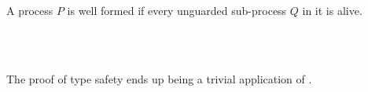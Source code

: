 A process $P$ is well formed if every unguarded sub-process $Q$ in it is alive.

\begin{code}%
\>[0]%
\>[18]\AgdaSymbol{:}\AgdaSpace{}%
\AgdaSymbol{\}}\AgdaSpace{}%
\AgdaSpace{}%
\AgdaSpace{}%
\AgdaSpace{}%
\AgdaSpace{}%
\<%
\\
\>[0]\AgdaSpace{}%
\AgdaSymbol{\{}\AgdaSymbol{\}}\AgdaSpace{}%
%
\>[18]\AgdaSymbol{=}%
\>[156I]\AgdaSymbol{\}}\AgdaSpace{}%
\AgdaSymbol{\{}\AgdaSpace{}%
\AgdaSymbol{:}\AgdaSpace{}%
\AgdaSpace{}%
\AgdaSpace{}%
\AgdaSymbol{\}}\AgdaSpace{}%
\AgdaSymbol{\{}\AgdaSpace{}%
\AgdaSymbol{:}\AgdaSpace{}%
\AgdaSpace{}%
\AgdaSymbol{\}}\AgdaSpace{}%
\<%
\\
\>[.][@{}l@{}]\<[156I]%
\>[20]\AgdaSpace{}%
\AgdaSpace{}%
\AgdaSymbol{(}\AgdaSpace{}%
\AgdaSpace{}%
\AgdaSpace{}%
\AgdaSymbol{)}\AgdaSpace{}%
\AgdaSpace{}%
\AgdaSpace{}%
\<%
\end{code}

The proof of type safety ends up being a trivial application of
.

\begin{code}%
\>[0]\AgdaSpace{}%
\AgdaSymbol{:}\AgdaSpace{}%
\AgdaSymbol{\}}\AgdaSpace{}%
\AgdaSymbol{(}\AgdaSpace{}%
\AgdaSymbol{:}\AgdaSpace{}%
\AgdaSpace{}%
\AgdaSymbol{)}\AgdaSpace{}%
\AgdaSpace{}%
\AgdaSpace{}%
\<%
\\
\>[0]\AgdaSpace{}%
\AgdaSpace{}%
\AgdaSymbol{\{\AgdaUnderscore{}\}}\AgdaSpace{}%
\AgdaSymbol{\{\AgdaUnderscore{}\}}\AgdaSpace{}%
\AgdaSymbol{\{}\AgdaSymbol{\}}\AgdaSpace{}%
\AgdaSymbol{\AgdaUnderscore{}}\AgdaSpace{}%
\AgdaSymbol{=}\AgdaSpace{}%
\AgdaSpace{}%
\<%
\end{code}